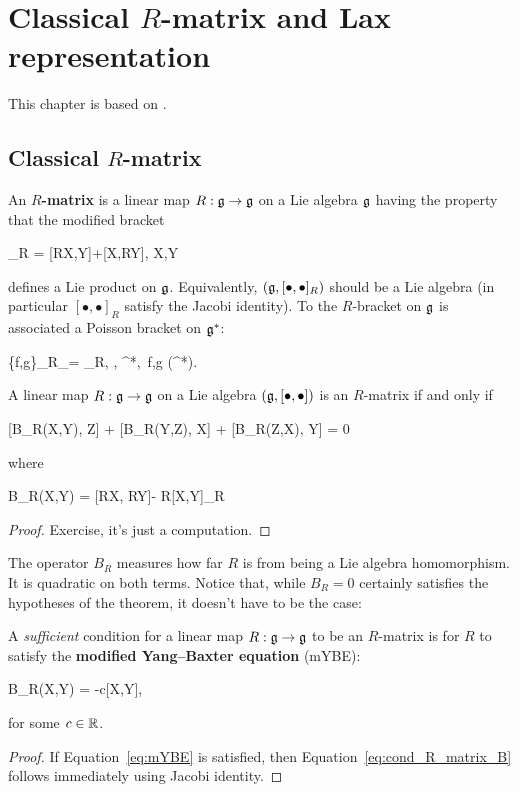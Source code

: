 \documentclass[main.tex]{subfiles}
\begin{document}
\chapter{Classical $R$-matrix and Lax representation}
This chapter is based on \cite[Section 3]{oevel1989r}.

\section[Classical R-matrix]{Classical $R$-matrix}
\begin{definition}
	An \textbf{$R$-matrix} is a linear map $R: \mathfrak g \to \mathfrak g$ on a Lie algebra $\mathfrak g$ having the property that the modified bracket
	\begin{eqalign}
		[X,Y]_R = [RX,Y]+[X,RY], \quad \forall X,Y \in \lalg
	\end{eqalign}
	defines a Lie product on $\mathfrak g$. Equivalently, $(\mathfrak g, [\bullet, \bullet]_R)$ should be a Lie algebra (in particular $[\bullet, \bullet]_R$ satisfy the Jacobi identity).
	To the $R$-bracket on $\mathfrak g$ is associated a Poisson bracket on $\mathfrak g^*$:
	\begin{eqalign}
		\{f,g\}_R\vert_\xi = _R, \xi \rangle, \quad \forall \xi \in \lalg^*,\, \forall f,g \in \Cinfty(\lalg^*).
	\end{eqalign}
\end{definition}

\begin{proposition}
	A linear map $R: \mathfrak g \to \mathfrak g$ on a Lie algebra $(\mathfrak g, [\bullet,\bullet])$ is an $R$-matrix if and only if
	\begin{eqalign}
	\label{eq:cond_R_matrix_B}
		[B_R(X,Y), Z] + [B_R(Y,Z), X] + [B_R(Z,X), Y] = 0
	\end{eqalign}
	where
	\begin{eqalign}
		B_R(X,Y) = [RX, RY]- R[X,Y]_R
	\end{eqalign}
\end{proposition}
\begin{proof}
	Exercise, it's just a computation.
\end{proof}

The operator $B_R$ measures how far $R$ is from being a Lie algebra homomorphism. It is quadratic on both terms. Notice that, while $B_R = 0$ certainly satisfies the hypotheses of the theorem, it doesn't have to be the case:

\begin{corollary}
	A \emph{sufficient} condition for a linear map $R: \mathfrak g \to \mathfrak g$ to be an $R$-matrix is for $R$ to satisfy the \textbf{modified Yang--Baxter equation} (mYBE):
	\begin{eqalign}
	\label{eq:mYBE}
		B_R(X,Y) = -c[X,Y],
	\end{eqalign}
	for some $c \in \mathbb{R}$.
\end{corollary}
\begin{proof}
	If Equation~\eqref{eq:mYBE} is satisfied, then Equation~\eqref{eq:cond_R_matrix_B} follows immediately using Jacobi identity.
\end{proof}
\end{document}
